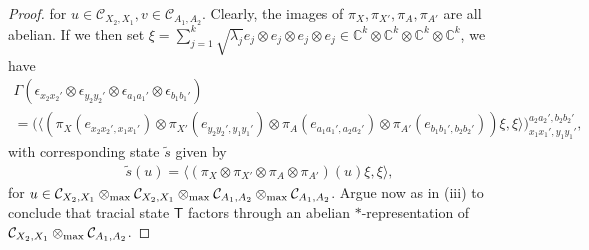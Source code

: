 \documentclass[11pt]{amsart}
\newcommand{\cl}[1]{\mathcal{#1}}
\newcommand{\bb}[1]{\mathbb{#1}}
\begin{document}
\begin{proof}
\noindent for $u \in \cl{C}_{X_{2}, X_{1}}, v \in \cl{C}_{A_{1}, A_{2}}$. Clearly, the images of $\pi_{X}, \pi_{X'}, \pi_{A}, \pi_{A'}$ are all abelian. If we then set $\xi = \sum_{j=1}^{k}\sqrt{\lambda_{j}}e_{j}\otimes e_{j}\otimes e_{j}\otimes e_{j} \in \bb{C}^{k}\otimes \bb{C}^{k} \otimes \bb{C}^{k}\otimes \bb{C}^{k}$, we have
\begin{gather*}
	\Gamma(\epsilon_{x_{2}x_{2}'}\otimes \epsilon_{y_{2}y_{2}'}\otimes \epsilon_{a_{1}a_{1}'}\otimes \epsilon_{b_{1}b_{1}'})  
	\\ = \bigg(\langle(\pi_{X}(e_{x_{2}x_{2}',x_{1}x_{1}'})\otimes \pi_{X'}(e_{y_{2}y_{2}', y_{1}y_{1}'})\otimes \pi_{A}(e_{a_{1}a_{1}', a_{2}a_{2}'})\otimes \pi_{A'}(e_{b_{1}b_{1}', b_{2}b_{2}'}))\xi, \xi\rangle\bigg)_{x_{1}x_{1}', y_{1}y_{1}'}^{a_{2}a_{2}', b_{2}b_{2}'},
\end{gather*}
\noindent with corresponding state $\tilde{s}$ given by 
\begin{gather*}
	\tilde{s}(u) = \langle (\pi_{X}\otimes \pi_{X'}\otimes \pi_{A}\otimes \pi_{A'})(u)\xi, \xi\rangle, 
\end{gather*}
\noindent for  $u \in \cl{C}_{X_{2}, X_{1}}\otimes_{\rm max} \cl{C}_{X_{2}, X_{1}}\otimes_{\rm max} \cl{C}_{A_{1}, A_{2}}\otimes_{\rm max} \cl{C}_{A_{1}, A_{2}}$. Argue now as in (iii) to conclude that tracial state $\mathsf{T}$ factors through an abelian $*$-representation of $\cl{C}_{X_{2}, X_{1}}\otimes_{\rm max} \cl{C}_{A_{1}, A_{2}}$.
\end{proof}
\end{document}
